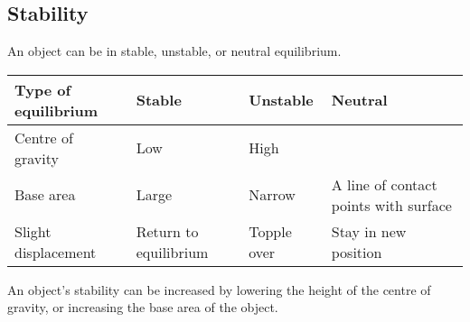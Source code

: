 \documentclass[../main.tex]{subfiles}
\begin{document}
	\subsection{Stability}
		An object can be in stable, unstable, or neutral equilibrium.
		\begin{center}
		\begin{tabularx}{\linewidth}{X|XXX}
			\hline \hline
			Type of equilibrium & Stable & Unstable & Neutral \\
			\hline
			Centre of gravity & Low & High & \\
			Base area & Large & Narrow & A line of contact points with surface \\
			Slight displacement & Return to equilibrium & Topple over & Stay in new position \\
			\hline \hline
		\end{tabularx}
		\end{center}
	
		An object's stability can be increased by lowering the height of the centre of gravity, or increasing the base area of the object.
\end{document}
